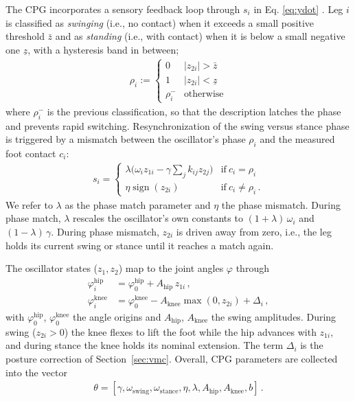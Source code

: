 \documentclass[letterpaper, 10 pt, conference]{ieeeconf}  %
\begin{document}
The CPG incorporates a sensory feedback loop through $s_i$ in Eq. \ref{eq:ydot} \cite{righetti2008pattern}. Leg $i$ is classified as \emph{swinging} (i.e., no contact) when it exceeds a small positive threshold $\bar{z}$ and as \emph{standing} (i.e., with contact) when it is below a small negative one $\underline{z}$, with a hysteresis band in between;
\begin{align}
		\rho_i := \begin{cases}
		0 & |z_{2i}| > \bar{z} \\
		1 & |z_{2i}| < \underline{z} \\
		\rho_i^{-} & \text{otherwise}
	\end{cases}
  \label{eq:phase-classify}
\end{align}
where $\rho_i^{-}$ is the previous classification, so that the description latches the phase and prevents rapid switching. Resynchronization of the swing versus stance phase is triggered by a mismatch between the oscillator's phase $\rho_i$ and the measured foot contact $c_i$:
\begin{align}
s_i = \begin{cases} 
		\lambda \big( \omega_i z_{1i} - \gamma \textstyle\sum_{j} k_{ij} z_{2j} \big) & \text{if}\  c_i = \rho_i \\
	 	\eta \operatorname{sign}(z_{2i}) & \text{if}\ c_i \neq \rho_i \, . 
	\end{cases}
  \label{eq:feedback}
\end{align}
We refer to $\lambda$ as the phase match parameter and $\eta$ the phase mismatch. During phase match, $\lambda$ rescales the oscillator's own constants to $(1+\lambda)\,\omega_i$ and $(1-\lambda)\,\gamma$. During phase mismatch, $z_{2i}$ is driven away from zero, i.e., the leg holds its current swing or stance until it reaches a match again.

The oscillator states ($z_1,z_2$) map to the joint angles $\varphi$ through
\begin{align}
  \varphi^{\text{hip}}_i &=  \varphi^{\text{hip}}_0  +  A_{\text{hip}}\, z_{1i} \,, \label{eq:joint-map-hip} \\
  \varphi^{\text{knee}}_i &= \varphi^{\text{knee}}_0  -  A_{\text{knee}} \max( 0, z_{2i})  +  \Delta_i \,,
  \label{eq:joint-map}
\end{align}
with $\varphi^{\text{hip}}_0$, $\varphi^{\text{knee}}_0$ the angle origins and $A_{\text{hip}}$, $A_{\text{knee}}$ the swing amplitudes.
During swing ($z_{2i} > 0$) the knee flexes to lift the foot while the hip advances with $z_{1i}$, and during stance the knee holds its nominal extension.
The term $\Delta_i$ is the posture correction of Section~\ref{sec:vmc}.
%
Overall, CPG parameters are collected into the vector
\begin{align}
    \theta = [\gamma, \omega_{\text{swing}}, \omega_{\text{stance}}, \eta, \lambda, A_{\text{hip}}, A_{\text{knee}}, b] \, .
    \label{eq:cpg-parameters}
\end{align}
\end{document}
